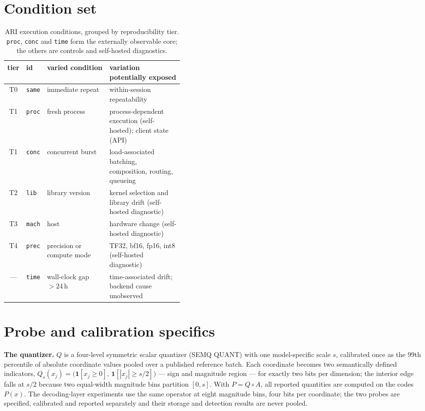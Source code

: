 \documentclass{article}
\begin{document}
\normalsize
\appendix

\section{Condition set}\label{app:conditions}

\begin{table}[H]
\centering\caption{ARI execution conditions, grouped by reproducibility tier. \texttt{proc}, \texttt{conc} and \texttt{time} form the externally observable core; the others are controls and self-hosted diagnostics.}\label{tab:conditions}\footnotesize\setlength{\tabcolsep}{4pt}
\begin{tabular}{cllp{0.42\linewidth}}
\toprule
tier & id & varied condition & variation potentially exposed \\
\midrule
T0 & \texttt{same} & immediate repeat & within-session repeatability \\
T1 & \texttt{proc} & fresh process & process-dependent execution (self-hosted); client state (API) \\
T1 & \texttt{conc} & concurrent burst & load-associated batching, composition, routing, queueing \\
T2 & \texttt{lib} & library version & kernel selection and library drift (self-hosted diagnostic) \\
T3 & \texttt{mach} & host & hardware change (self-hosted diagnostic) \\
T4 & \texttt{prec} & precision or compute mode & TF32, bf16, fp16, int8 (self-hosted diagnostic) \\
--- & \texttt{time} & wall-clock gap $>24$\,h & time-associated drift; backend cause unobserved \\
\bottomrule
\end{tabular}
\end{table}

\section{Probe and calibration specifics}\label{app:calib}

\textbf{The quantizer.} $Q$ is a four-level symmetric scalar quantizer (SEMQ QUANT) with one model-specific scale $s$, calibrated once as the 99th percentile of absolute coordinate values pooled over a published reference batch. Each coordinate becomes two semantically defined indicators, $Q_s(x_j)=\bigl(\mathbf 1[x_j\ge0],\,\mathbf 1[|x_j|\ge s/2]\bigr)$ --- sign and magnitude region --- for exactly two bits per dimension; the interior edge falls at $s/2$ because two equal-width magnitude bins partition $[0,s]$. With $P=Q\circ A$, all reported quantities are computed on the codes $P(x)$. The decoding-layer experiments use the same operator at eight magnitude bins, four bits per coordinate; the two probes are specified, calibrated and reported separately and their storage and detection results are never pooled.
\end{document}
